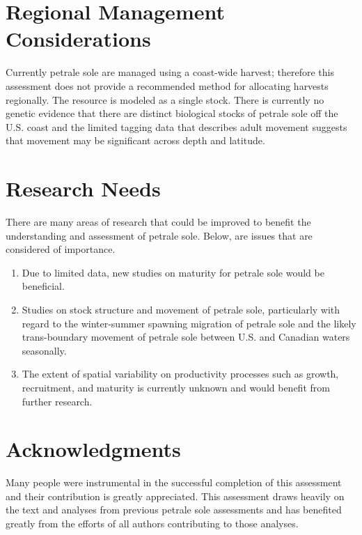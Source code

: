\documentclass[12pt,]{article}
\begin{document}
\section{Regional Management
Considerations}\label{regional-management-considerations}

Currently petrale sole are managed using a coast-wide harvest; therefore
this assessment does not provide a recommended method for allocating
harvests regionally. The resource is modeled as a single stock. There is
currently no genetic evidence that there are distinct biological stocks
of petrale sole off the U.S. coast and the limited tagging data that
describes adult movement suggests that movement may be significant
across depth and latitude.

\section{Research Needs}\label{research-needs}

There are many areas of research that could be improved to benefit the
understanding and assessment of petrale sole. Below, are issues that are
considered of importance.

\begin{enumerate}

\item Due to limited data, new studies on maturity  for petrale sole would be beneficial.

\item Studies on stock structure and movement of petrale sole, particularly with regard to the winter-summer spawning migration of petrale sole and the likely trans-boundary movement of petrale sole between U.S. and Canadian waters seasonally.

\item The extent of spatial variability on productivity processes such as growth, recruitment, and maturity is currently unknown and would benefit from further research.

\end{enumerate}

\section{Acknowledgments}\label{acknowledgments}

Many people were instrumental in the successful completion of this
assessment and their contribution is greatly appreciated. This
assessment draws heavily on the text and analyses from previous petrale
sole assessments and has benefited greatly from the efforts of all
authors contributing to those analyses.
\end{document}
